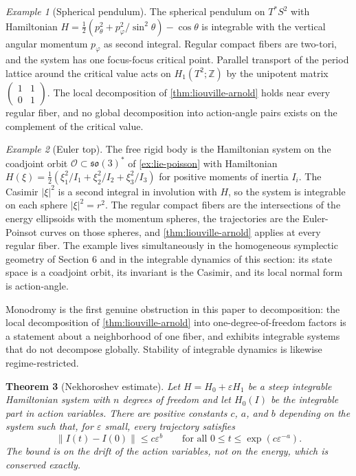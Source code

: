 \documentclass[11pt,letterpaper]{article}
\newtheorem{theorem}{Theorem}[section]
\theoremstyle{definition}
\theoremstyle{remark}
\newtheorem{example}[theorem]{Example}
\begin{document}
\begin{example}[Spherical pendulum]
\label{ex:pendulum}
The spherical pendulum on $T^{*} S^{2}$ with Hamiltonian $H = \tfrac{1}{2} (p_{\theta}^{2} + p_{\varphi}^{2} / \sin^{2}\theta) - \cos \theta$ is integrable with the vertical angular momentum $p_{\varphi}$ as second integral. Regular compact fibers are two-tori, and the system has one focus-focus critical point. Parallel transport of the period lattice around the critical value acts on $H_1(T^{2}; \mathbb{Z})$ by the unipotent matrix $\begin{pmatrix} 1 & 1 \\ 0 & 1 \end{pmatrix}$. The local decomposition of \cref{thm:liouville-arnold} holds near every regular fiber, and no global decomposition into action-angle pairs exists on the complement of the critical value.
\end{example}

\begin{example}[Euler top]
\label{ex:euler-top}
The free rigid body is the Hamiltonian system on the coadjoint orbit $\mathcal{O} \subset \mathfrak{so}(3)^{*}$ of \cref{ex:lie-poisson} with Hamiltonian $H(\xi) = \tfrac{1}{2} (\xi_1^{2} / I_1 + \xi_2^{2} / I_2 + \xi_3^{2} / I_3)$ for positive moments of inertia $I_i$. The Casimir $|\xi|^{2}$ is a second integral in involution with $H$, so the system is integrable on each sphere $|\xi|^{2} = r^{2}$. The regular compact fibers are the intersections of the energy ellipsoids with the momentum spheres, the trajectories are the Euler-Poinsot curves on those spheres, and \cref{thm:liouville-arnold} applies at every regular fiber. The example lives simultaneously in the homogeneous symplectic geometry of Section 6 and in the integrable dynamics of this section: its state space is a coadjoint orbit, its invariant is the Casimir, and its local normal form is action-angle.
\end{example}

Monodromy is the first genuine obstruction in this paper to decomposition: the local decomposition of \cref{thm:liouville-arnold} into one-degree-of-freedom factors is a statement about a neighborhood of one fiber, and  exhibits integrable systems that do not decompose globally. Stability of integrable dynamics is likewise regime-restricted.

\begin{theorem}[Nekhoroshev estimate]
\label{thm:nekhoroshev}
Let $H = H_0 + \varepsilon H_1$ be a steep integrable Hamiltonian system with $n$ degrees of freedom and let $H_0(I)$ be the integrable part in action variables. There are positive constants $c$, $a$, and $b$ depending on the system such that, for $\varepsilon$ small, every trajectory satisfies
\[
\| I(t) - I(0) \| \leq c \varepsilon^{b}
\qquad \text{for all } 0 \leq t \leq \exp(c \varepsilon^{-a}).
\]
The bound is on the drift of the action variables, not on the energy, which is conserved exactly.
\end{theorem}
\end{document}
